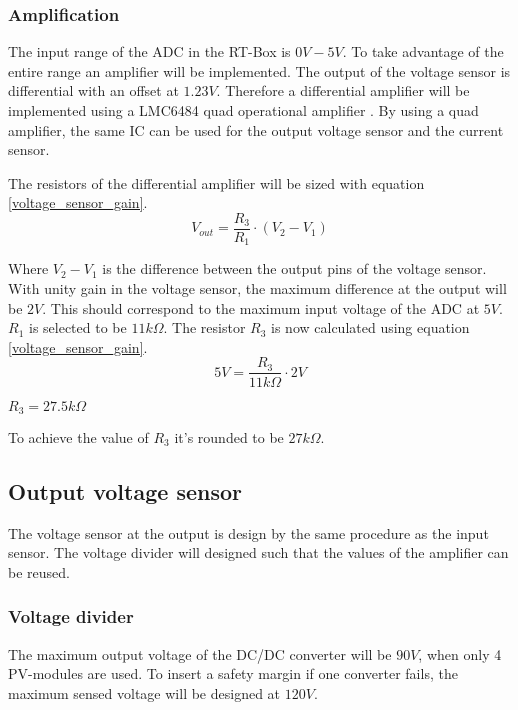 \subsubsection{Amplification} \label{voltage_sensor_amplification}
The input range of the ADC in the RT-Box is $0V-5V$. To take advantage of the entire range an amplifier will be implemented. The output of the voltage sensor is differential with an offset at $1.23V$. Therefore a differential amplifier will be implemented using a LMC6484 quad operational amplifier \cite{sensor_opamp}. By using a quad amplifier, the same IC can be used for the output voltage sensor and the current sensor.

The resistors of the differential amplifier will be sized with equation \ref{voltage_sensor_gain}.
\begin{equation} \label{voltage_sensor_gain}
	V_{out} = \frac{R_3}{R_1} \cdot (V_2-V_1)
\end{equation}

Where $V_2-V_1$ is the difference between the output pins of the voltage sensor. With unity gain in the voltage sensor, the maximum difference at the output will be $2V$. This should correspond to the maximum input voltage of the ADC at $5V$. $R_1$ is selected to be $11k\Omega$. The resistor $R_3$ is now calculated using equation \ref{voltage_sensor_gain}.
\begin{equation}
	5V = \frac{R_3}{11k\Omega} \cdot 2V
\end{equation}
\begin{center}
	$R_3 = 27.5k\Omega$
\end{center}
To achieve the value of $R_3$ it's rounded to be $27k\Omega$. 

\subsection{Output voltage sensor}
The voltage sensor at the output is design by the same procedure as the input sensor. The voltage divider will designed such that the values of the amplifier can be reused.

\subsubsection{Voltage divider}
The maximum output voltage of the DC/DC converter will be $90V$, when only 4 PV-modules are used. To insert a safety margin if one converter fails, the maximum sensed voltage will be designed at $120V$.

